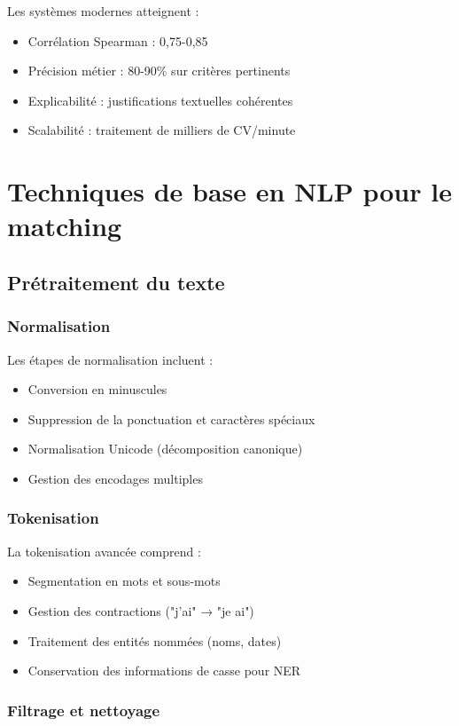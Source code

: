 \documentclass[12pt,a4paper]{report}
\begin{document}
Les systèmes modernes atteignent :
\begin{itemize}
\item Corrélation Spearman : 0,75-0,85
\item Précision métier : 80-90\% sur critères pertinents
\item Explicabilité : justifications textuelles cohérentes
\item Scalabilité : traitement de milliers de CV/minute
\end{itemize}

\section{Techniques de base en NLP pour le matching}

\subsection{Prétraitement du texte}

\subsubsection{Normalisation}

Les étapes de normalisation incluent :
\begin{itemize}
\item Conversion en minuscules
\item Suppression de la ponctuation et caractères spéciaux
\item Normalisation Unicode (décomposition canonique)
\item Gestion des encodages multiples
\end{itemize}

\subsubsection{Tokenisation}

La tokenisation avancée comprend :
\begin{itemize}
\item Segmentation en mots et sous-mots
\item Gestion des contractions ("j'ai" → "je ai")
\item Traitement des entités nommées (noms, dates)
\item Conservation des informations de casse pour NER
\end{itemize}

\subsubsection{Filtrage et nettoyage}
\end{document}
